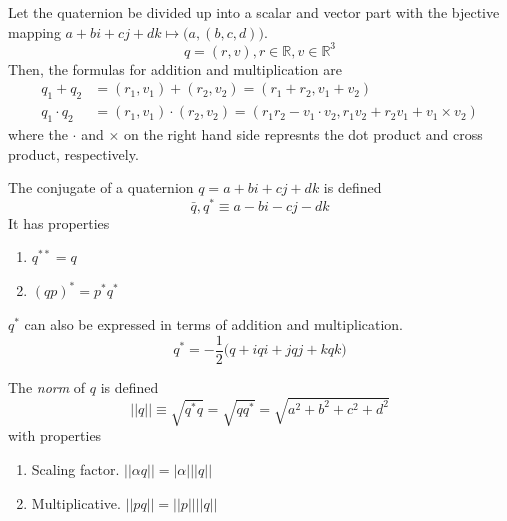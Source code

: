 \documentclass{article}
\begin{document}
    \begin{proposition}
      Let the quaternion be divided up into a scalar and vector part with the bjective mapping $a + bi + cj + dk \mapsto \big(a, (b, c, d)\big)$. 
      \begin{equation}
        q = (r, v), r \in \mathbb{R}, v \in \mathbb{R}^3
      \end{equation}
      Then, the formulas for addition and multiplication are
      \begin{align*}
        q_1 + q_2 & = (r_1, v_1) + (r_2, v_2) = (r_1 + r_2, v_1 + v_2) \\
        q_1 \cdot q_2 & = (r_1, v_1) \cdot (r_2, v_2) = (r_1 r_2 - v_1 \cdot v_2, r_1 v_2 + r_2 v_1 + v_1 \times v_2)
      \end{align*}
      where the $\cdot$ and $\times$ on the right hand side represnts the dot product and cross product, respectively. 
    \end{proposition}

    \begin{definition}
      The conjugate of a quaternion $q = a + bi + cj + dk$ is defined 
      \begin{equation}
        \bar{q}, q^* \equiv a - bi - cj - dk
      \end{equation}
      It has properties
      \begin{enumerate}
        \item $q^{**} = q$
        \item $(q p)^* = p^* q^*$
      \end{enumerate}
      $q^*$ can also be expressed in terms of addition and multiplication. 
      \begin{equation}
        q^* = -\frac{1}{2} \big( q + iqi + jqj + kqk \big)
      \end{equation}
    \end{definition}

    \begin{definition}
      The \textit{norm} of $q$ is defined
      \begin{equation}
        ||q|| \equiv \sqrt{q^* q} = \sqrt{q q^*} = \sqrt{a^2 + b^2 + c^2 + d^2}
      \end{equation}
      with properties
      \begin{enumerate}
        \item Scaling factor. $||\alpha q|| = |\alpha| ||q||$
        \item Multiplicative. $||p q|| = ||p|| ||q||$
      \end{enumerate}
    \end{definition}
\end{document}

